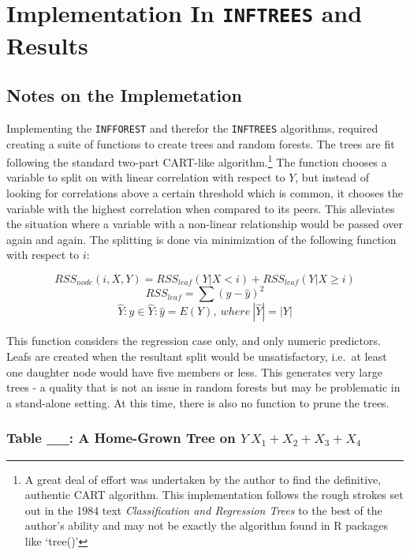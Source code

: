 \documentclass[12pt,twoside]{reedthesis}
\begin{document}
  \section{\texorpdfstring{Implementation In \texttt{INFTREES} and
  Results}{Implementation In INFTREES and Results}}\label{implementation-in-inftrees-and-results}
  
  \subsection{Notes on the
  Implemetation}\label{notes-on-the-implemetation}
  
  Implementing the \texttt{INFFOREST} and therefor the \texttt{INFTREES}
  algorithms, required creating a suite of functions to create trees and
  random forests. The trees are fit following the standard two-part
  CART-like algorithm.\footnote{A great deal of effort was undertaken by
    the author to find the definitive, authentic CART algorithm. This
    implementation follows the rough strokes set out in the 1984 text
    \emph{Classification and Regression Trees} to the best of the author's
    ability and may not be exactly the algorithm found in R packages like
    `tree()'} The function chooses a variable to split on with linear
  correlation with respect to \(Y\), but instead of looking for
  correlations above a certain threshold which is common, it chooses the
  variable with the highest correlation when compared to its peers. This
  alleviates the situation where a variable with a non-linear relationship
  would be passed over again and again. The splitting is done via
  minimization of the following function with respect to \(i\):
  
  \[RSS_{node} (i,X,Y) = RSS_{leaf}(Y|X <i) + RSS_{leaf}(Y|X \geq i) \]
  \[RSS_{leaf} = \sum (y - \hat{y})^2 \]
  \[\hat{Y}: \hat{y} \in \hat{Y}: \hat{y} = E(Y), \ where\  |\hat{Y}| = |Y|\]
  
  This function considers the regression case only, and only numeric
  predictors. Leafs are created when the resultant split would be
  unsatisfactory, i.e.~at least one daughter node would have five members
  or less. This generates very large trees - a quality that is not an
  issue in random forests but may be problematic in a stand-alone setting.
  At this time, there is also no function to prune the trees.
  
  \subsubsection{\texorpdfstring{Table \_\_: A Home-Grown Tree on
  \(Y~X_1+X_2+X_3+X_4\)}{Table \_\_: A Home-Grown Tree on Y\textasciitilde{}X\_1+X\_2+X\_3+X\_4}}\label{table-__-a-home-grown-tree-on-yx_1x_2x_3x_4}
  
\end{document}
